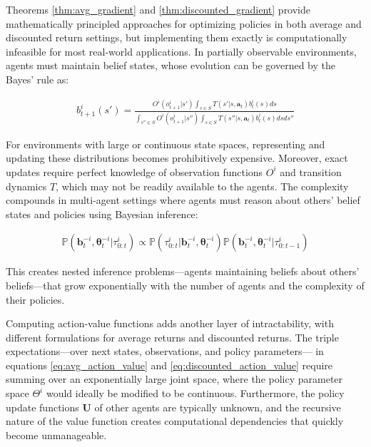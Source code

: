 \documentclass[a4paper,12pt]{report}
\begin{document}
Theorems \ref{thm:avg_gradient} and \ref{thm:discounted_gradient} provide mathematically principled approaches for optimizing policies in both average and discounted return settings, but implementing them exactly is computationally infeasible for most real-world applications. In partially observable environments, agents must maintain belief states, whose evolution can be governed by the Bayes' rule as:

\begin{align}
    b^i_{t+1}(s') = \frac{O^i(o^i_{t+1}|s') \int_{s \in S} T(s'|s, \boldsymbol{a}_t) b^i_t(s) ds}{\int_{s'' \in S} O^i(o^i_{t+1}|s'') \int_{s \in S} T(s''|s, \boldsymbol{a}_t) b^i_t(s) ds ds''}
\end{align}

For environments with large or continuous state spaces, representing and updating these distributions becomes prohibitively expensive. Moreover, exact updates require perfect knowledge of observation functions $O^i$ and transition dynamics $T$, which may not be readily available to the agents. The complexity compounds in multi-agent settings where agents must reason about others' belief states and policies using Bayesian inference:

\begin{align}
    \mathbb{P}(\boldsymbol{b}^{-i}_t, \boldsymbol{\theta}^{-i}_t | \tau^i_{0:t}) \propto \mathbb{P}(\tau^i_{0:t} | \boldsymbol{b}^{-i}_t, \boldsymbol{\theta}^{-i}_t) \mathbb{P}(\boldsymbol{b}^{-i}_t, \boldsymbol{\theta}^{-i}_t | \tau^i_{0:t-1})
\end{align}

This creates nested inference problems—agents maintaining beliefs about others' beliefs—that grow exponentially with the number of agents and the complexity of their policies.

Computing action-value functions adds another layer of intractability, with different formulations for average returns and discounted returns. The triple expectations—over next states, observations, and policy parameters— in equations \eqref{eq:avg_action_value} and \eqref{eq:discounted_action_value} require summing over an exponentially large joint space, where the policy parameter space $\Theta^i$ would ideally be modified to be continuous. Furthermore, the policy update functions $\boldsymbol{U}$ of other agents are typically unknown, and the recursive nature of the value function creates computational dependencies that quickly become unmanageable.
\end{document}
